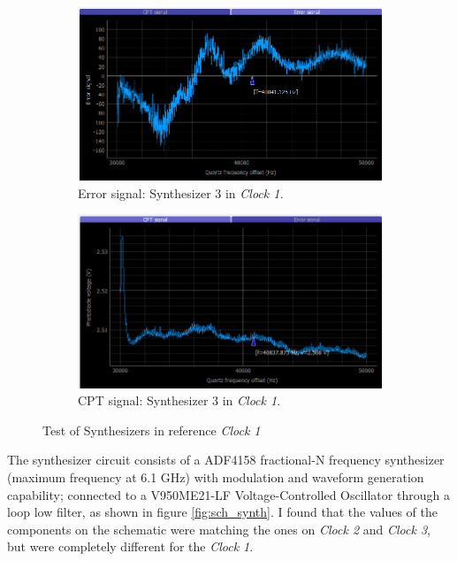 \documentclass[a4paper,12pt]{article}
\begin{document}
\begin{figure}[!h]
\centering
\begin{subfigure}[b]{0.49\textwidth}
\centering
\includegraphics[height=0.5\textwidth]{Images/c1_synth_3_2_2.png}
\captionsetup{justification=centering}
\caption{Error signal: Synthesizer 3 in \textit{Clock 1.}}
\end{subfigure}
\hfill
\begin{subfigure}[b]{0.49\textwidth}
\centering
\includegraphics[height=0.5\textwidth]{Images/c1_synth_3_1_2.png}
\captionsetup{justification=centering}
\caption{CPT signal: Synthesizer 3 in \textit{Clock 1}.}
\end{subfigure}

\caption{Test of Synthesizers in reference \textit{Clock 1}} 
\label{fig:synth_test}
\end{figure}

The synthesizer circuit consists of a ADF4158 fractional-N frequency synthesizer (maximum frequency at 6.1 GHz) with modulation and waveform generation capability; connected to a V950ME21-LF Voltage-Controlled Oscillator through a loop low filter, as shown in figure \ref{fig:sch_synth}. I found that the values of the components on the schematic were matching the ones on \textit{Clock 2} and \textit{Clock 3}, but were completely different for the \textit{Clock 1}. 
\end{document}
